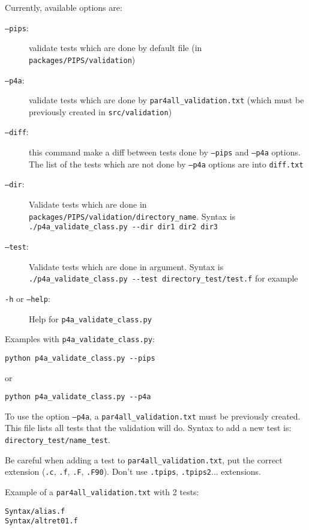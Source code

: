 \documentclass[a4paper]{article}
\begin{document}
Currently, available options are:
\begin{description}
\item[\texttt{--pips}:] validate tests which are done by default file (in
  \texttt{packages/PIPS/validation})

\item[\texttt{--p4a}:] validate tests which are done by
  \verb|par4all_validation.txt| (which must be previously created in
  \texttt{src/validation})

\item[\texttt{--diff}:] this command make a diff between tests done by
  \texttt{--pips} and \texttt{--p4a} options. The list of the tests which
  are not done by \texttt{--p4a} options are into \texttt{diff.txt}

\item[\texttt{--dir}:] Validate tests which are done in \verb|packages/PIPS/validation/directory_name|. Syntax is \verb|./p4a_validate_class.py --dir dir1 dir2 dir3|

\item[\texttt{--test}:] Validate tests which are done in argument. Syntax is \verb|./p4a_validate_class.py --test directory_test/test.f| for example

\item[\texttt{-h} or \texttt{--help}:] Help for \verb|p4a_validate_class.py|
\end{description}

Examples with \verb|p4a_validate_class.py|:
\begin{verbatim}
python p4a_validate_class.py --pips
\end{verbatim}
or
\begin{verbatim}
python p4a_validate_class.py --p4a
\end{verbatim}

To use the option \texttt{--p4a}, a \verb|par4all_validation.txt| must be
previously created. This file lists all tests that the validation will do.
Syntax to add a new test is: \verb|directory_test/name_test|.

Be careful when adding a test to \verb|par4all_validation.txt|, put the
correct extension (\texttt{.c}, \texttt{.f}, \texttt{.F},
\texttt{.F90}). Don't use \texttt{.tpips}, \texttt{.tpips2}... extensions.

Example of a \verb|par4all_validation.txt| with 2 tests:
\begin{verbatim}
Syntax/alias.f
Syntax/altret01.f
\end{verbatim}
\end{document}
